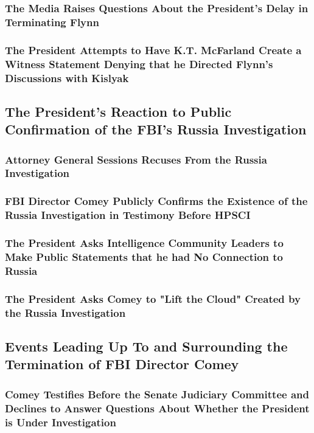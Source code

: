 \subsubsection{The Media Raises Questions About the President's Delay in Terminating Flynn}

\subsubsection{The President Attempts to Have K.T. McFarland Create a Witness Statement Denying that he Directed Flynn's Discussions with Kislyak}

\subsection{The President's Reaction to Public Confirmation of the FBI's Russia Investigation}

\subsubsection{Attorney General Sessions Recuses From the Russia Investigation}

\subsubsection{FBI Director Comey Publicly Confirms the Existence of the Russia Investigation in Testimony Before HPSCI}

\subsubsection{The President Asks Intelligence Community Leaders to Make Public Statements that he had No Connection to Russia}

\subsubsection{The President Asks Comey to "Lift the Cloud" Created by the Russia Investigation}

\subsection{Events Leading Up To and Surrounding the Termination of FBI Director Comey}

\subsubsection{Comey Testifies Before the Senate Judiciary Committee and Declines to Answer Questions About Whether the President is Under Investigation}

